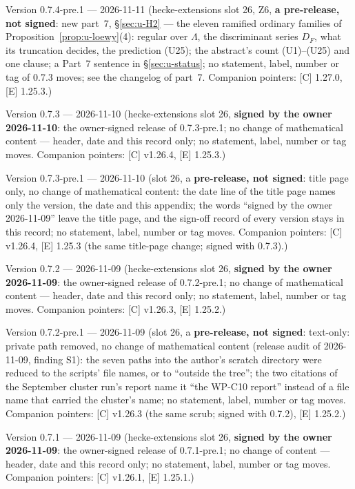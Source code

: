 \documentclass[11pt]{article}
\newcommand{\Iw}{\Lambda}                         %
\begin{document}
Version 0.7.4-pre.1 --- 2026-11-11 (hecke-extensions slot 26, Z6, \textbf{a pre-release, not signed}: new part~7, \S\ref{sec:u-H2} --- the eleven ramified ordinary families of Proposition~\ref{prop:u-loewy}(4): regular over $\Iw$, the discriminant series $D_F$, what its truncation decides, the prediction (U25); the abstract's count (U1)--(U25) and one clause; a Part~7 sentence in \S\ref{sec:u-status}; no statement, label, number or tag of 0.7.3 moves; see the changelog of part~7. Companion pointers: [C] 1.27.0, [E] 1.25.3.)

Version 0.7.3 --- 2026-11-10 (hecke-extensions slot 26, \textbf{signed by the owner 2026-11-10}: the owner-signed release of 0.7.3-pre.1; no change of mathematical content --- header, date and this record only; no statement, label, number or tag moves. Companion pointers: [C] v1.26.4, [E] 1.25.3.)

Version 0.7.3-pre.1 --- 2026-11-10 (slot 26, a \textbf{pre-release, not signed}: title page only, no change of mathematical content: the date line of the title page names only the version, the date and this appendix; the words ``signed by the owner 2026-11-09'' leave the title page, and the sign-off record of every version stays in this record; no statement, label, number or tag moves. Companion pointers: [C] v1.26.4, [E] 1.25.3 (the same title-page change; signed with 0.7.3).)

Version 0.7.2 --- 2026-11-09 (hecke-extensions slot 26, \textbf{signed by the owner 2026-11-09}: the owner-signed release of 0.7.2-pre.1; no change of mathematical content --- header, date and this record only; no statement, label, number or tag moves. Companion pointers: [C] v1.26.3, [E] 1.25.2.)

Version 0.7.2-pre.1 --- 2026-11-09 (slot 26, a \textbf{pre-release, not signed}: text-only: private path removed, no change of mathematical content (release audit of 2026-11-09, finding S1): the seven paths into the author's scratch directory were reduced to the scripts' file names, or to ``outside the tree''; the two citations of the September cluster run's report name it ``the WP-C10 report'' instead of a file name that carried the cluster's name; no statement, label, number or tag moves. Companion pointers: [C] v1.26.3 (the same scrub; signed with 0.7.2), [E] 1.25.2.)

Version 0.7.1 --- 2026-11-09 (hecke-extensions slot 26, \textbf{signed by the owner 2026-11-09}: the owner-signed release of 0.7.1-pre.1; no change of content --- header, date and this record only; no statement, label, number or tag moves. Companion pointers: [C] v1.26.1, [E] 1.25.1.)
\end{document}
